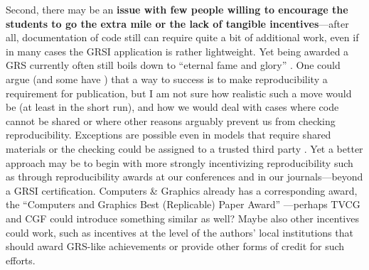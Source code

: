 \documentclass[conference]{vgtc}                     %
\begin{document}
Second, there may be an \textbf{issue with few people willing to encourage the students to go the extra mile or the lack of tangible incentives}---after all, documentation of code still can require quite a bit of additional work, even if in many cases the GRSI application is rather lightweight. Yet being awarded a GRS currently often still boils down to ``eternal fame and glory'' \cite{Isenberg:2022:PEP}. One could argue (and some have \cite{Haroz:2018:OPV}) that a way to success is to make reproducibility a requirement for publication, but I am not sure how realistic such a move would be (at least in the short run), and how we would deal with cases where code cannot be shared or where other reasons arguably prevent us from checking reproducibility. Exceptions are possible even in models that require shared materials \cite{Haroz:2018:OPV} or the checking could be assigned to a trusted third party \cite{Besancon:2021:OSS}. Yet a better approach may be to begin with more strongly incentivizing reproducibility such as through reproducibility awards at our conferences and in our journals---beyond a GRSI certification. Computers \& Graphics already has a corresponding award, the ``Computers and Graphics Best (Replicable) Paper Award'' \cite{Jorge:2020:NEC}---perhaps TVCG and CGF could introduce something similar as well? Maybe also other incentives could work, such as incentives at the level of the authors' local institutions that should award GRS-like achievements or provide other forms of credit for such efforts.
\end{document}
